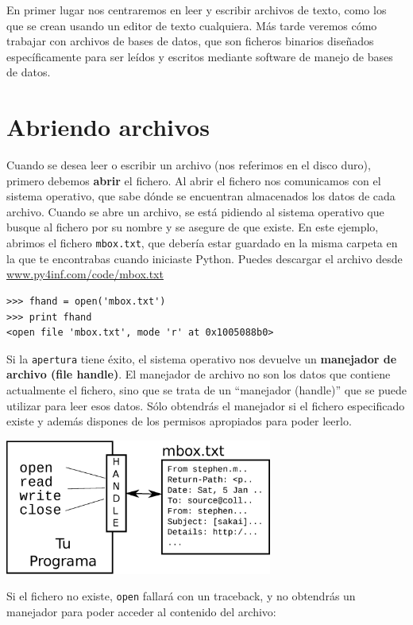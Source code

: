 En primer lugar nos centraremos en leer y escribir archivos de texto,
como los que se crean usando un editor de texto cualquiera. Más tarde veremos cómo
trabajar con archivos de bases de datos, que son ficheros binarios diseñados
específicamente para ser leídos y escritos mediante software de manejo de bases de datos.

\section{Abriendo archivos}

Cuando se desea leer o escribir un archivo (nos referimos en el disco duro), primero
debemos {\bf abrir} el fichero. Al abrir el fichero nos comunicamos con el sistema
operativo, que sabe dónde se encuentran almacenados los datos de cada archivo. Cuando se
abre un archivo, se está pidiendo al sistema operativo que busque al fichero por su nombre
y se asegure de que existe. En este ejemplo, abrimos el fichero
{\tt mbox.txt}, que debería estar guardado en la misma carpeta en la que te
encontrabas cuando iniciaste Python.
Puedes descargar el archivo desde
\url{www.py4inf.com/code/mbox.txt}

\beforeverb
\begin{verbatim}
>>> fhand = open('mbox.txt')
>>> print fhand
<open file 'mbox.txt', mode 'r' at 0x1005088b0>
\end{verbatim}
\afterverb
%
Si la {\tt apertura} tiene éxito, el sistema operativo nos devuelve un
{\bf manejador de archivo (file handle)}. El manejador de archivo no son los datos que
contiene actualmente el fichero, sino que se trata de un ``manejador (handle)'' que se
puede utilizar para leer esos datos. Sólo obtendrás el manejador si el fichero especificado
existe y además dispones de los permisos apropiados para poder leerlo.

\beforefig
\centerline{\includegraphics[height=1.75in]{figs2/handle.eps}}
\afterfig

Si el fichero no existe, {\tt open} fallará con un traceback, y no obtendrás
un manejador para poder acceder al contenido del archivo:

